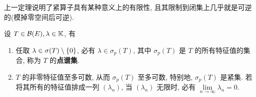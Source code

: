 \begin{Remark}
	上一定理说明了紧算子具有某种意义上的有限性, 且其限制到闭集上几乎就是可逆的(模掉零空间后可逆).
\end{Remark}

\begin{Theorem}\label{thm:紧算子的点谱集性质}
	设 $ T\in\mathcal{B}(E), \lambda\in\mathbb{K} $, 有
	\begin{enumerate}[(1)]
		\item 任取 $ \lambda\in\sigma(T)\setminus \{ 0 \} $, 必有 $ \lambda\in\sigma_{p}(T) $, 其中 $ \sigma_{p}(T) $ 是 $ T $ 的所有特征值的集合, 称为 $ T $ 的\textbf{点谱集}.
		\item $ T $ 的非零特征值至多可数, 从而 $ \sigma_{p}(T) $ 至多可数, 特别地,  $ \sigma_{p}(T) $ 是紧集. 若将其所有的特征值排成一列 $ (\lambda_{n}) $, 当 $ (\lambda_{n}) $ 无限时, 必有 $ \lim\limits_{n\to\infty}\lambda_{n}=0 $.
	\end{enumerate}
\end{Theorem}
